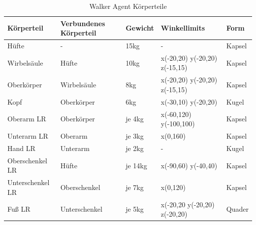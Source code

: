 \begin{table}[H]
  \centering
  {
  \begin{tabular}{ |p{3cm}|p{3cm}|p{2cm}|p{4cm}|p{2cm}| }
  \hline
  \textbf{Körpertei}l& \textbf{Verbundenes Körperteil} & \textbf{Gewicht} & \textbf{Winkellimits} & \textbf{Form} \\
  \hline
  Hüfte & - & 15kg & - & Kapsel \\
  \hline
  Wirbelsäule & Hüfte & 10kg & x(-20,20) y(-20,20) z(-15,15) & Kapsel \\
  \hline
  Oberkörper & Wirbelsäule & 8kg & x(-20,20) y(-20,20) z(-15,15) & Kapsel \\
  \hline
  Kopf & Oberkörper & 6kg & x(-30,10) y(-20,20) & Kugel \\
  \hline
  Oberarm LR & Oberkörper & je 4kg & x(-60,120) y(-100,100) & Kapsel \\
  \hline
  Unterarm LR & Oberarm & je 3kg & x(0,160) & Kapsel \\
  \hline
  Hand LR & Unterarm & je 2kg & - & Kugel \\
  \hline
  Oberschenkel LR & Hüfte & je 14kg& x(-90,60) y(-40,40) & Kapsel \\
  \hline
  Unterschenkel LR & Oberschenkel & je 7kg &  x(0,120) & Kapsel \\
  \hline
  Fuß LR & Unterschenkel & je 5kg & x(-20,20 y(-20,20) z(-20,20) & Quader \\
  \hline
  \end{tabular}}
  \caption{Walker Agent Körperteile}
  \label{table:walker_körperteile}
\end{table}

